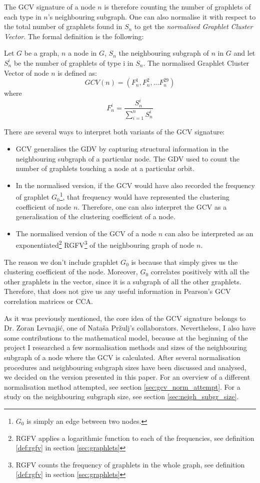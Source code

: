 The GCV signature of a node $n$ is therefore counting the number of graphlets of each type in $n$'s neighbouring subgraph. One can also normalise it with respect to the total number of graphlets found in $S_n$ to get the \emph{normalised Graphlet Cluster Vector}. The formal definition is the following:

\begin{mydef}
\label{def:norm_gcv}
 Let $G$ be a graph, $n$ a node in $G$, \( S_n \) the neighbouring subgraph of $n$ in $G$ and let \( S_n^i\) be the number of graphlets of type i in \( S_n \). The normalised Graphlet Cluster Vector of node $n$ is defined as:
 $$ GCV(n) = \left(F_n^1, F_n^2, ... F_n^{29}\right)$$
 where
 $$ F_n^i = \frac{S_n^i}{\sum_{i=1}^{n}S_n^i} $$
\end{mydef}

There are several ways to interpret both variants of the GCV signature:
\begin{itemize}
 \item GCV generalises the GDV by capturing structural information in the neighbouring subgraph of a particular node. The GDV used to count the number of graphlets touching a node at a particular orbit. 
 \item In the normalised version, if the GCV would have also recorded the frequency of graphlet $G_0$\footnote{$G_0$ is simply an edge between two nodes.}, that frequency would have represented the clustering coefficient of node $n$. Therefore, one can also interpret the GCV as a generalisation of the clustering coefficient of a node.
 \item The normalised version of the GCV of a node $n$ can also be interpreted as an exponentiated\footnote{RGFV applies a logarithmic function to each of the frequencies, see definition \ref{def:rgfv} in section \ref{sec:graphlets}} RGFV\footnote{RGFV counts the frequency of graphlets in the whole graph, see definition \ref{def:rgfv} in section \ref{sec:graphlets}} of the neighbouring graph of node $n$.
\end{itemize}

The reason we don't include graphlet $G_0$ is because that simply gives us the clustering coefficient of the node. Moreover, $G_0$ correlates positively with all the other graphlets in the vector, since it is a subgraph of all the other graphlets. Therefore, that does not give us any useful information in Pearson's GCV correlation matrices or CCA. 

As it was previously mentioned, the core idea of the GCV signature belongs to Dr. Zoran Levnaji\'{c}, one of Nata\v{s}a Pr\v{z}ulj's collaborators. Nevertheless, I also have some contributions to the mathematical model, because at the beginning of the project I researched a few normalisation methods and sizes of the neighbouring subgraph of a node where the GCV is calculated. After several normalisation procedures and neighbouring subgraph sizes have been discussed and analysed, we decided on the version presented in this paper. For an overview of a different normalisation method attempted, see section \ref{sec:gcv_norm_attempt}. For a study on the neighbouring subgraph size, see section \ref{sec:neigh_subgr_size}.

